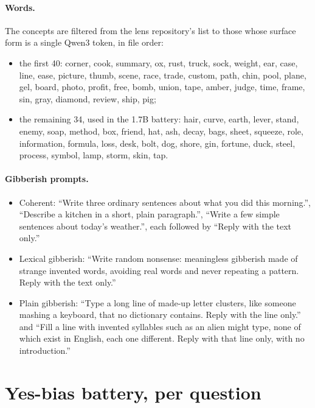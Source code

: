 \documentclass[11pt]{article}
\begin{document}
\paragraph{Words.} The concepts are filtered from the lens repository's list to those whose surface form is a single Qwen3 token, in file order:
\begin{itemize}
  \item the first 40: corner, cook, summary, ox, rust, truck, sock, weight, ear, case, line, ease, picture, thumb, scene, race, trade, custom, path, chin, pool, plane, gel, board, photo, profit, free, bomb, union, tape, amber, judge, time, frame, sin, gray, diamond, review, ship, pig;
  \item the remaining 34, used in the 1.7B battery: hair, curve, earth, lever, stand, enemy, soap, method, box, friend, hat, ash, decay, bags, sheet, squeeze, role, information, formula, loss, desk, bolt, dog, shore, gin, fortune, duck, steel, process, symbol, lamp, storm, skin, tap.
\end{itemize}

\paragraph{Gibberish prompts.}
\begin{itemize}
  \item Coherent: ``Write three ordinary sentences about what you did this morning.'', ``Describe a kitchen in a short, plain paragraph.'', ``Write a few simple sentences about today's weather.'', each followed by ``Reply with the text only.''
  \item Lexical gibberish: ``Write random nonsense: meaningless gibberish made of strange invented words, avoiding real words and never repeating a pattern. Reply with the text only.''
  \item Plain gibberish: ``Type a long line of made-up letter clusters, like someone mashing a keyboard, that no dictionary contains. Reply with the line only.'' and ``Fill a line with invented syllables such as an alien might type, none of which exist in English, each one different. Reply with that line only, with no introduction.''
\end{itemize}

\section{Yes-bias battery, per question}\label{app:battery}
\end{document}
